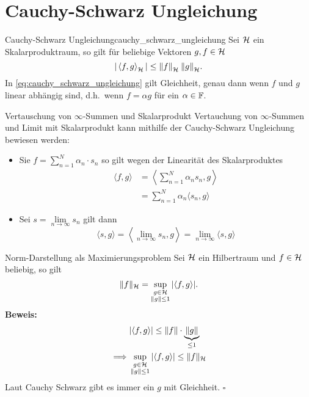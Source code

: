 \section{Cauchy-Schwarz Ungleichung}

\begin{mytheo}{Cauchy-Schwarz Ungleichung}{cauchy_schwarz_ungleichung}
  Sei $\mathcal{H}$ ein Skalarproduktraum, so gilt für beliebige Vektoren $g, f \in \mathcal{H}$
  \begin{equation}
    |\,{\langle f, g \rangle}_{\mathcal{H}}\,| \leq {\|f\|}_{\mathcal{H}} \: {\|g\|}_{\mathcal{H}}.\label{eq:cauchy_schwarz_ungleichung}
  \end{equation}
  In \eqref{eq:cauchy_schwarz_ungleichung} gilt Gleichheit, genau dann wenn $f$ und $g$ linear abhängig sind, d.h.\ wenn $f = \alpha g$ für ein $\alpha \in \mathbb{F}$.
\end{mytheo}

\begin{recipe}{Vertauschung von $\infty$-Summen und Skalarprodukt}
Vertauchung von $\infty$-Summen und Limit mit Skalarprodukt kann mithilfe der Cauchy-Schwarz Ungleichung bewiesen werden:
        \begin{itemize}
                \item Sie $f = \sum\limits_{n=1}^{N} \alpha_{n}\cdot s_{n}$ so gilt wegen der Linearität des Skalarproduktes
                \begin{align*}
                \langle f, g \rangle &= \left\langle \sum\limits_{n=1}^{N} \alpha_{n}s_{n}, g \right\rangle\\
                &= \sum\limits_{n=1}^{N} \alpha_{n} \langle s_{n}, g \rangle
                \end{align*}
                \item Sei $s = \lim\limits_{n\to\infty} s_{n}$ gilt dann
                \begin{equation*}
                  \langle s, g\rangle = \left\langle \lim\limits_{n\to\infty} s_{n}, g \right\rangle = \lim\limits_{n\to\infty} \langle s, g \rangle
                \end{equation*}
        \end{itemize}
\end{recipe}

\begin{recipe}{Norm-Darstellung als Maximierungsproblem}
  Sei $\mathcal{H}$ ein Hilbertraum und $f\in\mathcal{H}$ beliebig, so gilt
  \begin{equation*}
    \|f\|_{\mathcal{H}} = \sup_{\substack{g\in\mathcal{H}\\ \|g\| \leq 1}}|\langle f, g \rangle|.
  \end{equation*}
  \textbf{Beweis:}
  \begin{align*}
    &|\langle f, g \rangle| \leq \| f\| \cdot \underbrace{\|g\|}_{\leq 1}\\
    \implies &\sup_{\substack{g\in\mathcal{H}\\ \|g\| \leq 1}} |\langle f, g \rangle| \leq \|f\|_{\mathcal{H}}
  \end{align*}
  Laut Cauchy Schwarz gibt es immer ein $g$ mit Gleichheit.  $\square$
\end{recipe}
